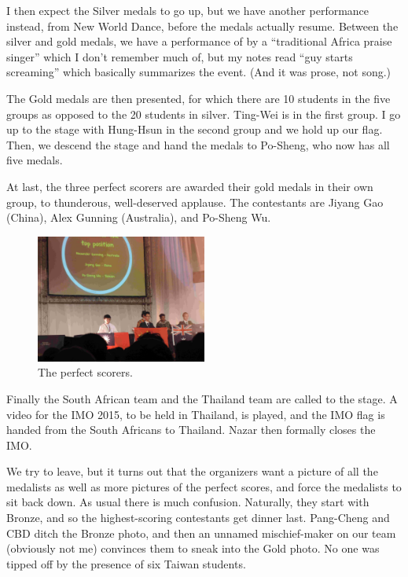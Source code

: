 \documentclass[11pt]{scrreprt}
\numberwithin{figure}{chapter}
\begin{document}
I then expect the Silver medals to go up, but we have another performance instead, from New World Dance,
before the medals actually resume. Between the silver and gold medals, we have a performance of by a ``traditional
Africa praise singer'' which I don't remember much of, but my notes read ``guy starts screaming'' which basically summarizes
the event. (And it was prose, not song.)

The Gold medals are then presented, for which there are 10 students in the five groups as opposed to the 20 students in silver.
Ting-Wei is in the first group.
I go up to the stage with Hung-Hsun in the second group and we hold up our flag.
Then, we descend the stage and hand the medals to Po-Sheng, who now has all five medals.

At last, the three perfect scorers are awarded their gold medals in their own group, to thunderous, well-deserved applause.
The contestants are Jiyang Gao (China), Alex Gunning (Australia), and Po-Sheng Wu.

\begin{figure}[ht]
  \centering
  \includegraphics[width=0.5\textwidth]{media/gold.jpg}
  \caption{The perfect scorers.}
\end{figure}

Finally the South African team and the Thailand team are called to the stage.
A video for the IMO 2015, to be held in Thailand, is played,
and the IMO flag is handed from the South Africans to Thailand.
Nazar then formally closes the IMO.

We try to leave, but it turns out that the organizers want a picture of all the medalists
as well as more pictures of the perfect scores, and force the medalists to sit back down.
As usual there is much confusion.
Naturally, they start with Bronze, and so the highest-scoring contestants get dinner last.
Pang-Cheng and CBD ditch the Bronze photo, and then an unnamed mischief-maker on our team (obviously not me)
convinces them to sneak into the Gold photo. No one was tipped off by the presence of six Taiwan students.
\end{document}
